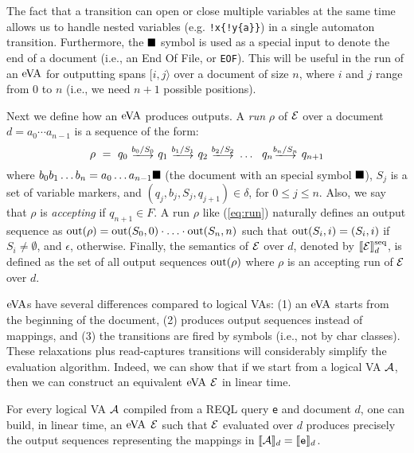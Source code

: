 
The fact that a transition can open or close multiple variables at the same time
allows us to handle nested variables (e.g. \texttt{!x\{!y\{a\}\}}) in a single
automaton transition. Furthermore, the $\blacksquare$ symbol is used as a special
input to denote the end of a document (i.e., an End Of File, or \texttt{EOF}).
This will be useful in the run of an $\mathrm{eVA}$ for outputting spans $[i, j\rangle$
over a document of size $n$, where $i$ and $j$ range from $0$ to $n$ (i.e., we
need $n+1$ possible positions).

Next we define how an $\mathrm{eVA}$ produces outputs. A \emph{run} $\rho$ of $\mathcal{E}$ over
a document $d = a_0 \cdots a_{n-1}$ is a sequence of the form:
\begin{equation}\label{eq:run}
	\rho \ = \ q_0 \ \longtrans{b_0 / S_0} \ q_1 \ \longtrans{b_1 / S_1} \ q_2 \ \longtrans{b_2 / S_2} \ \ldots \ \ q_{n} \longtrans{b_{n} / S_n} \ q_{n+1}
\end{equation}
where $b_0 b_1 \ldots b_n = a_0 \ldots a_{n-1} \blacksquare$ (the document with an
special symbol $\blacksquare$), $S_j$ is a set of variable markers, and
$(q_j,b_{j},S_{j}, q_{j+1}) \in \delta$, for $0\leq j\leq n$. Also, we say that
$\rho$ is \emph{accepting} if $q_{n+1} \in F$. A run $\rho$ like (\ref{eq:run})
naturally defines an output sequence as $\operatorname{out}(\rho) = \operatorname{out}(S_0, 0) \cdot
\ldots \cdot \operatorname{out}(S_n, n)$ such that $\operatorname{out}(S_i, i) = (S_i, i)$ if $S_i \neq
\emptyset$, and $\epsilon$, otherwise. Finally, the semantics of $\mathcal{E}$ over $d$,
denoted by $\llbracket\mathcal{E}\rrbracket^{\operatorname{seq}}_d$, is defined as the set of all output sequences
$\operatorname{out}(\rho)$ where $\rho$ is an accepting run of $\mathcal{E}$ over $d$.

$\mathrm{eVA}$s have several differences compared to logical VAs: (1) an $\mathrm{eVA}$ starts
from the beginning of the document, (2) produces output sequences instead of
mappings, and (3) the transitions are fired by symbols (i.e., not by char
classes). These relaxations plus read-captures transitions will considerably
simplify the evaluation algorithm.  Indeed, we can show that if we start from a
logical VA $\mathcal{A}$, then we can construct an equivalent $\mathrm{eVA}$ $\mathcal{E}$ in linear
time. %
\begin{proposition}\label{prop:eVAconstruction}
	For every logical VA $\mathcal{A}$ compiled from a REQL query \texttt{e} and
	document $d$, one can build, in linear time, an $\mathrm{eVA}$ $\mathcal{E}$ such that $\mathcal{E}$
	evaluated over $d$ produces precisely the output sequences representing the
	mappings in $\llbracket\mathcal{A}\rrbracket_d = \llbracket\texttt{e}\rrbracket_d$.
\end{proposition}

